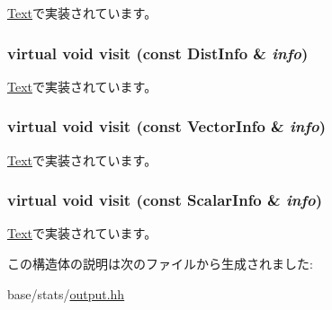 \hyperlink{classStats_1_1Text_a1d1e4614088a11f07d9ca033802d4d77}{Text}で実装されています。\hypertarget{structStats_1_1Output_add4fd62195e918f438ee10305ea0e20e}{
\subsubsection[{visit}]{\setlength{\rightskip}{0pt plus 5cm}virtual void visit (const {\bf DistInfo} \& {\em info})}}
\label{structStats_1_1Output_add4fd62195e918f438ee10305ea0e20e}


\hyperlink{classStats_1_1Text_a1d1b48c85e0f4ddab4cb23e57b855214}{Text}で実装されています。\hypertarget{structStats_1_1Output_a6157ee2f68b0738ae8a789d20584be4d}{
\subsubsection[{visit}]{\setlength{\rightskip}{0pt plus 5cm}virtual void visit (const {\bf VectorInfo} \& {\em info})}}
\label{structStats_1_1Output_a6157ee2f68b0738ae8a789d20584be4d}


\hyperlink{classStats_1_1Text_a1cc217540e3402a1d09b3b8c040abdb3}{Text}で実装されています。\hypertarget{structStats_1_1Output_a49159171d27306e1e047691f43efab71}{
\subsubsection[{visit}]{\setlength{\rightskip}{0pt plus 5cm}virtual void visit (const {\bf ScalarInfo} \& {\em info})}}
\label{structStats_1_1Output_a49159171d27306e1e047691f43efab71}


\hyperlink{classStats_1_1Text_ac9ee55cac7bc664352aeaffda82dc689}{Text}で実装されています。

この構造体の説明は次のファイルから生成されました:\begin{DoxyCompactItemize}
\item 
base/stats/\hyperlink{stats_2output_8hh}{output.hh}\end{DoxyCompactItemize}

